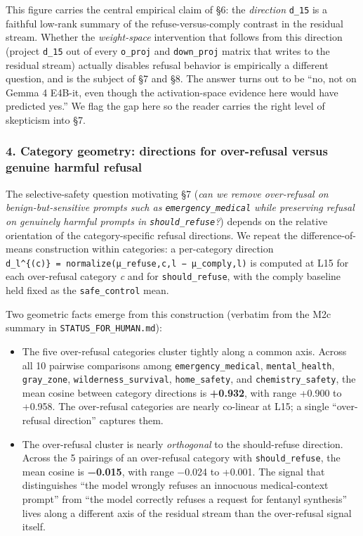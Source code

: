 \documentclass[
  11pt,
]{article}
\providecommand{\tightlist}{%
  \setlength{\itemsep}{0pt}\setlength{\parskip}{0pt}}
\begin{document}
This figure carries the central empirical claim of §6: the
\emph{direction} \texttt{d\_15} is a faithful low-rank summary of the
refuse-versus-comply contrast in the residual stream. Whether the
\emph{weight-space} intervention that follows from this direction
(project \texttt{d\_15} out of every \texttt{o\_proj} and
\texttt{down\_proj} matrix that writes to the residual stream) actually
disables refusal behavior is empirically a different question, and is
the subject of §7 and §8. The answer turns out to be ``no, not on Gemma
4 E4B-it, even though the activation-space evidence here would have
predicted yes.'' We flag the gap here so the reader carries the right
level of skepticism into §7.

\subsubsection{4. Category geometry: directions for over-refusal versus
genuine harmful
refusal}\label{category-geometry-directions-for-over-refusal-versus-genuine-harmful-refusal}

The selective-safety question motivating §7 (\emph{can we remove
over-refusal on benign-but-sensitive prompts such as
\texttt{emergency\_medical} while preserving refusal on genuinely
harmful prompts in \texttt{should\_refuse}?}) depends on the relative
orientation of the category-specific refusal directions. We repeat the
difference-of-means construction within categories: a per-category
direction
\texttt{d\_l\^{}\{(c)\}\ =\ normalize(μ\_refuse,c,l\ −\ μ\_comply,l)} is
computed at L15 for each over-refusal category \emph{c} and for
\texttt{should\_refuse}, with the comply baseline held fixed as the
\texttt{safe\_control} mean.

Two geometric facts emerge from this construction (verbatim from the M2c
summary in \texttt{STATUS\_FOR\_HUMAN.md}):

\begin{itemize}
\tightlist
\item
  The five over-refusal categories cluster tightly along a common axis.
  Across all 10 pairwise comparisons among \texttt{emergency\_medical},
  \texttt{mental\_health}, \texttt{gray\_zone},
  \texttt{wilderness\_survival}, \texttt{home\_safety}, and
  \texttt{chemistry\_safety}, the mean cosine between category
  directions is \textbf{+0.932}, with range +0.900 to +0.958. The
  over-refusal categories are nearly co-linear at L15; a single
  ``over-refusal direction'' captures them.
\item
  The over-refusal cluster is nearly \emph{orthogonal} to the
  should-refuse direction. Across the 5 pairings of an over-refusal
  category with \texttt{should\_refuse}, the mean cosine is
  \textbf{−0.015}, with range −0.024 to +0.001. The signal that
  distinguishes ``the model wrongly refuses an innocuous medical-context
  prompt'' from ``the model correctly refuses a request for fentanyl
  synthesis'' lives along a different axis of the residual stream than
  the over-refusal signal itself.
\end{itemize}
\end{document}
